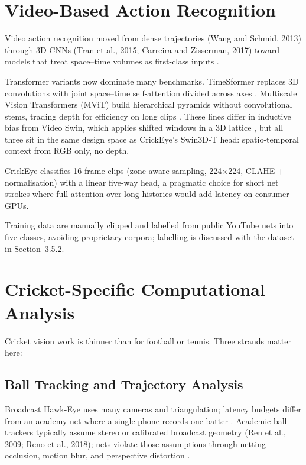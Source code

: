 \begin{justify}
\section{Video-Based Action Recognition}

\par Video action recognition moved from dense trajectories (Wang and Schmid, 2013) through 3D CNNs (Tran et al., 2015; Carreira and Zisserman, 2017) toward models that treat space--time volumes as first-class inputs \cite{Wang2013, Tran2015, Carreira2017}.

\par Transformer variants now dominate many benchmarks. TimeSformer replaces 3D convolutions with joint space--time self-attention divided across axes \cite{Bertasius2021}. Multiscale Vision Transformers (MViT) build hierarchical pyramids without convolutional stems, trading depth for efficiency on long clips \cite{Fan2021MViT}. These lines differ in inductive bias from Video Swin, which applies shifted windows in a 3D lattice \cite{Liu2022Swin3D}, but all three sit in the same design space as CrickEye’s Swin3D-T head: spatio-temporal context from RGB only, no depth.

\par CrickEye classifies 16-frame clips (zone-aware sampling, 224$\times$224, CLAHE + normalisation) with a linear five-way head, a pragmatic choice for short net strokes where full attention over long histories would add latency on consumer GPUs.

\par Training data are manually clipped and labelled from public YouTube nets into five classes, avoiding proprietary corpora; labelling is discussed with the dataset in Section~3.5.2.

\section{Cricket-Specific Computational Analysis}

\par Cricket vision work is thinner than for football or tennis. Three strands matter here:

\subsection{Ball Tracking and Trajectory Analysis}

\par Broadcast Hawk-Eye uses many cameras and triangulation; latency budgets differ from an academy net where a single phone records one batter \cite{HawkEye2001}. Academic ball trackers typically assume stereo or calibrated broadcast geometry (Ren et al., 2009; Reno et al., 2018); nets violate those assumptions through netting occlusion, motion blur, and perspective distortion \cite{Ren2009, Reno2018}.


\end{justify}
